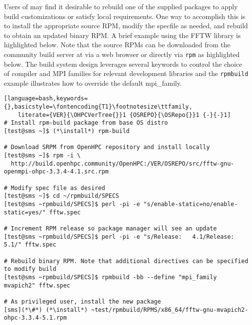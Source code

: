 Users of \OHPC{} may find it desirable to rebuild one of the supplied packages
to apply build customizations or satisfy local requirements. One way to
accomplish this is to install the appropriate source RPM, modify the specfile
as needed, and rebuild to obtain an updated binary RPM. A brief example using
the FFTW library is highlighted below.  Note that the source RPMs can be downloaded from the
community build server at \href{https://build.openhpc.community}
{\color{blue}{https://build.openhpc.community}} via a web browser or directly
via \texttt{rpm} as highlighted below. The \OHPC{} build system design
leverages several keywords to control the choice of compiler and MPI families
for relevant development libraries and the \texttt{rpmbuild} example
illustrates how to override the default mpi\_family.

\begin{lstlisting}[language=bash,keywords={},basicstyle=\fontencoding{T1}\footnotesize\ttfamily,
    literate={VER}{\OHPCVerTree{}}1 {OSREPO}{\OSRepo{}}1 {-}{-}1]
# Install rpm-build package from base OS distro
[test@sms ~]$ (*\install*) rpm-build

# Download SRPM from OpenHPC repository and install locally
[test@sms ~]$ rpm -i \
  http://build.openhpc.community/OpenHPC:/VER/OSREPO/src/fftw-gnu-openmpi-ohpc-3.3.4-4.1.src.rpm

# Modify spec file as desired
[test@sms ~]$ cd ~/rpmbuild/SPECS
[test@sms ~rpmbuild/SPECS]$ perl -pi -e "s/enable-static=no/enable-static=yes/" fftw.spec

# Increment RPM release so package manager will see an update
[test@sms ~rpmbuild/SPECS]$ perl -pi -e "s/Release:   4.1/Release:   5.1/" fftw.spec

# Rebuild binary RPM. Note that additional directives can be specified to modify build
[test@sms ~rpmbuild/SPECS]$ rpmbuild -bb --define "mpi_family mvapich2" fftw.spec

# As privileged user, install the new package
[sms](*\#*) (*\install*) ~test/rpmbuild/RPMS/x86_64/fftw-gnu-mvapich2-ohpc-3.3.4-5.1.rpm
\end{lstlisting}
